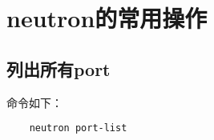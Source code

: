 \documentclass[a4paper,left=1.5cm,right=1.5cm,11pt]{article}
\begin{document}
\tableofcontents

\clearpage

\section{neutron的常用操作}
\subsection{列出所有port}
	命令如下：
	\begin{lstlisting}
	neutron port-list
	\end{lstlisting}
	
\end{document}
